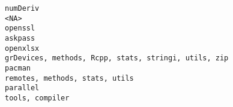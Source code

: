 \documentclass[
  letterpaper,
  DIV=11,
  numbers=noendperiod]{scrreprt}
\begin{document}
\begin{verbatim}
numDeriv                                                                                                                                                                                                                                                                                                                                                                                                                                                                                                                                                                                                              <NA>
openssl                                                                                                                                                                                                                                                                                                                                                                                                                                                                                                                                                                                                            askpass
openxlsx                                                                                                                                                                                                                                                                                                                                                                                                                                                                                                                                                              grDevices, methods, Rcpp, stats, stringi, utils, zip
pacman                                                                                                                                                                                                                                                                                                                                                                                                                                                                                                                                                                                      remotes, methods, stats, utils
parallel                                                                                                                                                                                                                                                                                                                                                                                                                                                                                                                                                                                                   tools, compiler

\end{verbatim}
\end{document}
